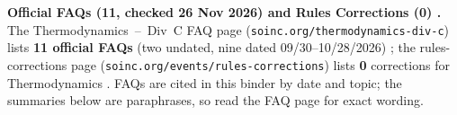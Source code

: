 \par\noindent\textbf{Official FAQs (11, checked 26 Nov 2026) and Rules Corrections (0) .}
The Thermodynamics~--~Div~C FAQ page (\texttt{soinc.org/thermodynamics-div-c}) lists \textbf{11 official FAQs} (two undated, nine dated 09/30--10/28/2026) ; the rules-corrections page (\texttt{soinc.org/events/rules-corrections}) lists \textbf{0} corrections for Thermodynamics . FAQs are cited in this binder by date and topic; the summaries below are paraphrases, so read the FAQ page for exact wording.

\par\smallskip\noindent

